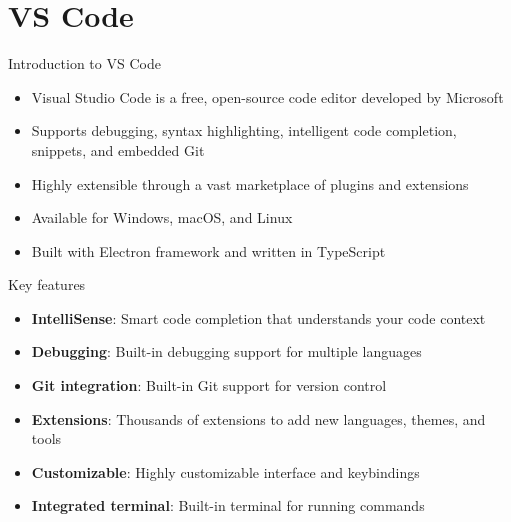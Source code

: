 \section{VS Code}

\begin{frame}[fragile]{Introduction to VS Code}
	\begin{itemize}
		\item Visual Studio Code is a free, open-source code editor developed by Microsoft
		\item Supports debugging, syntax highlighting, intelligent code completion, snippets, and embedded Git
		\item Highly extensible through a vast marketplace of plugins and extensions
		\item Available for Windows, macOS, and Linux
		\item Built with Electron framework and written in TypeScript
	\end{itemize}
\end{frame}

\begin{frame}[fragile]{Key features}
	\begin{itemize}
		\item \textbf{IntelliSense}: Smart code completion that understands your code context
		\item \textbf{Debugging}: Built-in debugging support for multiple languages
		\item \textbf{Git integration}: Built-in Git support for version control
		\item \textbf{Extensions}: Thousands of extensions to add new languages, themes, and tools
		\item \textbf{Customizable}: Highly customizable interface and keybindings
		\item \textbf{Integrated terminal}: Built-in terminal for running commands
	\end{itemize}
\end{frame}

